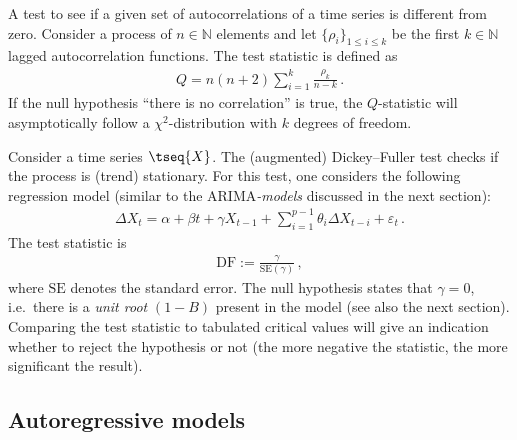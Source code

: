     \begin{method}
        A test to see if a given set of autocorrelations of a time series is different from zero. Consider a process of $n\in\mathbb{N}$ elements and let $\{\rho_i\}_{1\leq i\leq k}$ be the first $k\in\mathbb{N}$ lagged autocorrelation functions. The test statistic is defined as
        \begin{gather}
            Q = n(n+2)\sum_{i=1}^k\frac{\rho_k}{n-k}\,.
        \end{gather}
        If the null hypothesis ``there is no correlation'' is true, the $Q$-statistic will asymptotically follow a $\chi^2$-distribution with $k$ degrees of freedom.
    \end{method}

    \begin{method}
        Consider a time series $\tseq{X}$. The (augmented) Dickey--Fuller test checks if the process is (trend) stationary. For this test, one considers the following regression model (similar to the ARIMA\textit{-models} discussed in the next section):
        \begin{gather}
            \Delta X_t = \alpha + \beta t + \gamma X_{t-1} + \sum_{i=1}^{p-1} \theta_i\Delta X_{t-i} + \varepsilon_t\,.
        \end{gather}
        The test statistic is
        \begin{gather}
            \mathrm{DF} := \frac{\gamma}{\mathrm{SE}(\gamma)}\,,
        \end{gather}
        where $\mathrm{SE}$ denotes the standard error. The null hypothesis states that $\gamma=0$, i.e.~there is a \textit{unit root} $(1-B)$ present in the model (see also the next section). Comparing the test statistic to tabulated critical values will give an indication whether to reject the hypothesis or not (the more negative the statistic, the more significant the result).
    \end{method}

\subsection{Autoregressive models}


